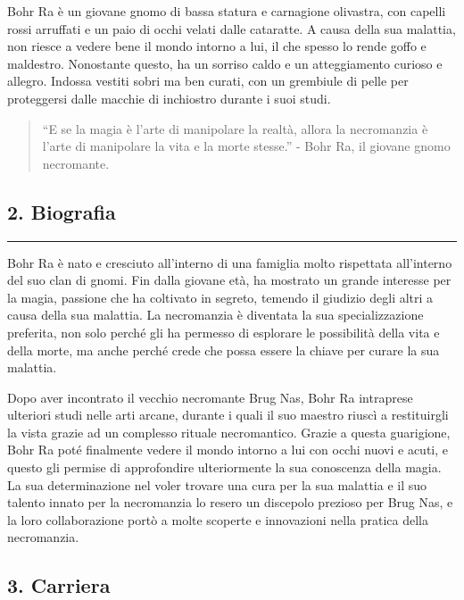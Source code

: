 Bohr Ra è un giovane gnomo di bassa statura e carnagione olivastra, con
capelli rossi arruffati e un paio di occhi velati dalle cataratte. A
causa della sua malattia, non riesce a vedere bene il mondo intorno a
lui, il che spesso lo rende goffo e maldestro. Nonostante questo, ha un
sorriso caldo e un atteggiamento curioso e allegro. Indossa vestiti
sobri ma ben curati, con un grembiule di pelle per proteggersi dalle
macchie di inchiostro durante i suoi studi.

\begin{quote}
``E se la magia è l'arte di manipolare la realtà, allora la necromanzia
è l'arte di manipolare la vita e la morte stesse.'' - Bohr Ra, il
giovane gnomo necromante.
\end{quote}

\subsection{2. Biografia}\label{biografia}

\begin{center}\rule{0.5\linewidth}{0.5pt}\end{center}

Bohr Ra è nato e cresciuto all'interno di una famiglia molto rispettata
all'interno del suo clan di gnomi. Fin dalla giovane età, ha mostrato un
grande interesse per la magia, passione che ha coltivato in segreto,
temendo il giudizio degli altri a causa della sua malattia. La
necromanzia è diventata la sua specializzazione preferita, non solo
perché gli ha permesso di esplorare le possibilità della vita e della
morte, ma anche perché crede che possa essere la chiave per curare la
sua malattia.

Dopo aver incontrato il vecchio necromante Brug Nas, Bohr Ra intraprese
ulteriori studi nelle arti arcane, durante i quali il suo maestro riuscì
a restituirgli la vista grazie ad un complesso rituale necromantico.
Grazie a questa guarigione, Bohr Ra poté finalmente vedere il mondo
intorno a lui con occhi nuovi e acuti, e questo gli permise di
approfondire ulteriormente la sua conoscenza della magia. La sua
determinazione nel voler trovare una cura per la sua malattia e il suo
talento innato per la necromanzia lo resero un discepolo prezioso per
Brug Nas, e la loro collaborazione portò a molte scoperte e innovazioni
nella pratica della necromanzia.

\subsection{3. Carriera}\label{carriera}

